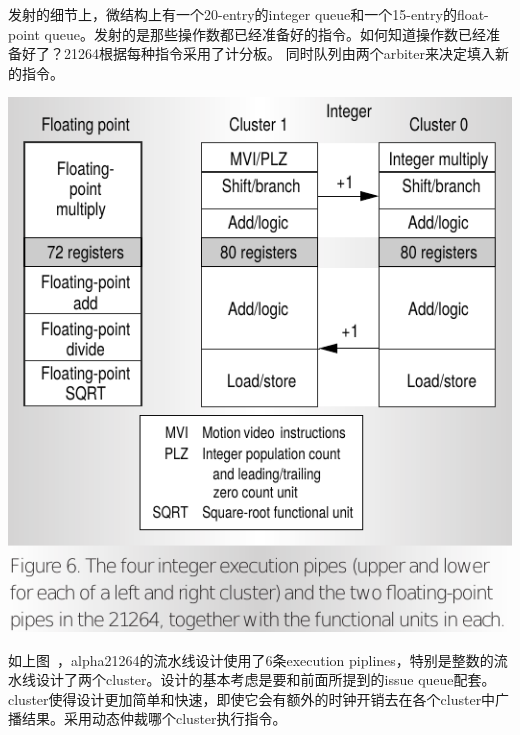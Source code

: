 \documentclass{article}
\begin{document}
\begin{multicols}{2}
\begin{enumerate}
		发射的细节上，微结构上有一个20-entry的integer queue和一个15-entry的float-point queue。发射的是那些操作数都已经准备好的指令。如何知道操作数已经准备好了？21264根据每种指令采用了计分板。
		同时队列由两个arbiter来决定填入新的指令。
		
		\includegraphics[width=\linewidth]{figs/pipeline.png}
		
		如上图~\cite{alpha}，alpha21264的流水线设计使用了6条execution piplines，特别是整数的流水线设计了两个cluster。设计的基本考虑是要和前面所提到的issue queue配套。cluster使得设计更加简单和快速，即使它会有额外的时钟开销去在各个cluster中广播结果。采用动态仲裁哪个cluster执行指令。
		

\end{enumerate}
\end{multicols}
\end{document}
